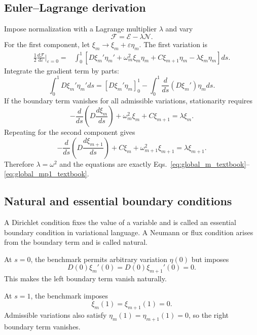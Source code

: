 \subsection{Euler--Lagrange derivation}
Impose normalization with a Lagrange multiplier $\lambda$ and vary
\begin{equation}
\mathcal F=\mathcal E-\lambda\mathcal N.
\end{equation}
For the first component, let $\xi_m\rightarrow\xi_m+\varepsilon\eta_m$. The first variation is
\begin{align}
\frac{1}{2}\frac{d\mathcal F}{d\varepsilon}\bigg|_{\varepsilon=0}
={}&\int_0^1\left[
D\xi_m'\eta_m'
+\omega_m^2\xi_m\eta_m
+C\xi_{m+1}\eta_m
-\lambda\xi_m\eta_m
\right]ds.
\end{align}
Integrate the gradient term by parts:
\begin{equation}
\int_0^1D\xi_m'\eta_m'ds
=\left[D\xi_m'\eta_m\right]_0^1
-\int_0^1\frac{d}{ds}(D\xi_m')\eta_mds.
\end{equation}
If the boundary term vanishes for all admissible variations, stationarity requires
\begin{equation}
-\frac{d}{ds}\left(D\frac{d\xi_m}{ds}\right)
+\omega_m^2\xi_m+C\xi_{m+1}=\lambda\xi_m.
\end{equation}
Repeating for the second component gives
\begin{equation}
-\frac{d}{ds}\left(D\frac{d\xi_{m+1}}{ds}\right)
+C\xi_m+\omega_{m+1}^2\xi_{m+1}=\lambda\xi_{m+1}.
\end{equation}
Therefore $\lambda=\omega^2$ and the equations are exactly Eqs.~\eqref{eq:global_m_textbook}--\eqref{eq:global_mp1_textbook}.

\subsection{Natural and essential boundary conditions}
A Dirichlet condition fixes the value of a variable and is called an essential boundary condition in variational language. A Neumann or flux condition arises from the boundary term and is called natural.

At $s=0$, the benchmark permits arbitrary variation $\eta(0)$ but imposes
\begin{equation}
D(0)\xi_m'(0)=D(0)\xi_{m+1}'(0)=0.
\end{equation}
This makes the left boundary term vanish naturally.

At $s=1$, the benchmark imposes
\begin{equation}
\xi_m(1)=\xi_{m+1}(1)=0.
\end{equation}
Admissible variations also satisfy $\eta_m(1)=\eta_{m+1}(1)=0$, so the right boundary term vanishes.

